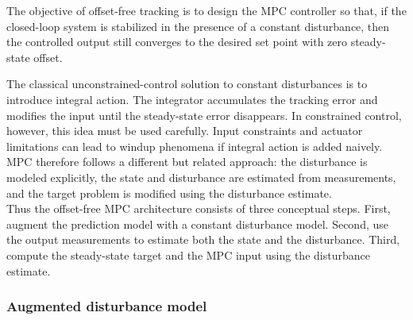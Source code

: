 \begin{theorembox}
The objective of offset-free tracking is to design the MPC controller so that, if the closed-loop
system is stabilized in the presence of a constant disturbance, then the controlled output still
converges to the desired set point with zero steady-state offset.
\end{theorembox}

The classical unconstrained-control solution to constant disturbances is to introduce integral
action. The integrator accumulates the tracking error and modifies the input until the steady-state
error disappears. In constrained control, however, this idea must be used carefully. Input
constraints and actuator limitations can lead to windup phenomena if integral action is added
naively. MPC therefore follows a different but related approach: the disturbance is modeled
explicitly, the state and disturbance are estimated from measurements, and the target problem is
modified using the disturbance estimate.\\
Thus the offset-free MPC architecture consists of three conceptual steps. First, augment the
prediction model with a constant disturbance model. Second, use the output measurements to
estimate both the state and the disturbance. Third, compute the steady-state target and the MPC
input using the disturbance estimate.

\subsubsection{Augmented disturbance model}

